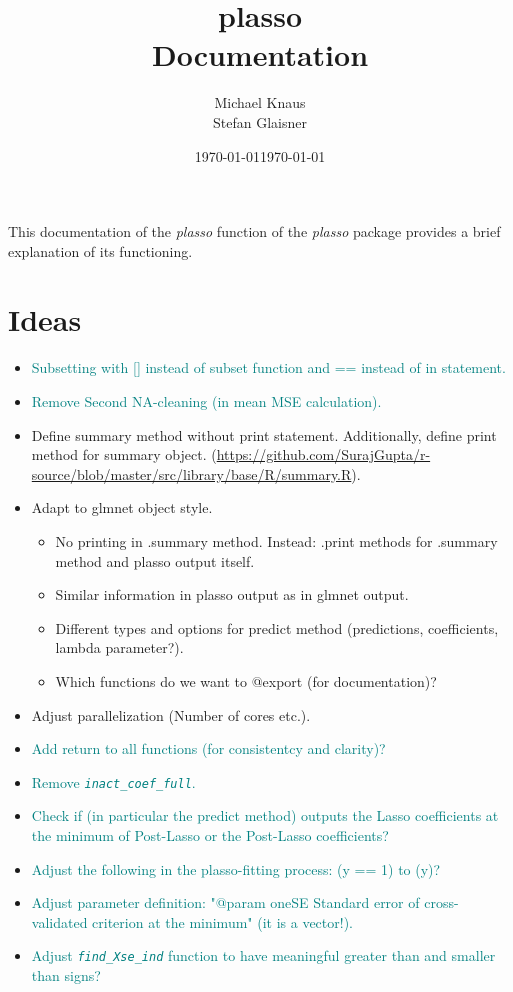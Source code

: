 \documentclass[12pt]{article}
\title{\vspace{-2cm} plasso \\ Documentation}
\author{Michael Knaus \\ Stefan Glaisner}
\date{\today}
\date{\today}
\begin{document}
\maketitle

This documentation of the \emph{plasso} function of the \emph{plasso} package provides a brief explanation of its functioning.

\section{Ideas}

\begin{itemize}
    \item \textcolor{teal}{Subsetting with [] instead of subset function and == instead of in statement.}
    \item \textcolor{teal}{Remove Second NA-cleaning (in mean MSE calculation).}
    \item Define summary method without print statement. Additionally, define print method for summary object. (\url{https://github.com/SurajGupta/r-source/blob/master/src/library/base/R/summary.R}).
    \item Adapt to glmnet object style.
    \begin{itemize}
        \item No printing in .summary method. Instead: .print methods for .summary method and plasso output itself.
        \item Similar information in plasso output as in glmnet output.
        \item Different types and options for predict method (predictions, coefficients, lambda parameter?).
        \item Which functions do we want to @export (for documentation)?
    \end{itemize}
    \item Adjust parallelization (Number of cores etc.).
    \item \textcolor{teal}{Add return to all functions (for consistentcy and clarity)?}
    \item \textcolor{teal}{Remove \emph{\texttt{inact\_coef\_full}}.}
    \item \textcolor{teal}{Check if (in particular the predict method) outputs the Lasso coefficients at the minimum of Post-Lasso or the Post-Lasso coefficients?}
    \item \textcolor{teal}{Adjust the following in the plasso-fitting process: (y == 1) to (y)?}
    \item \textcolor{teal}{Adjust parameter definition: "@param oneSE Standard error of cross-validated criterion at the minimum" (it is a vector!).}
    \item \textcolor{teal}{Adjust \emph{\texttt{find\_Xse\_ind}} function to have meaningful greater than and smaller than signs?}
\end{itemize}
\end{document}
